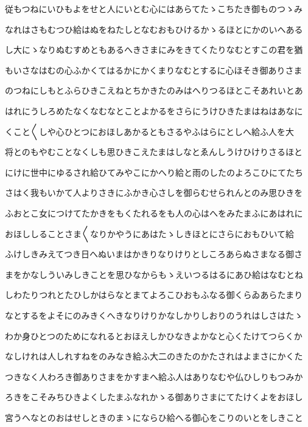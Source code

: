 \documentclass[a4paper,11pt,landscape]{ltjtarticle}
\begin{document}
\par\medskip
従もつねにいひもよをせと人にいとむ心にはあらてたゝこちたき御ものつゝみ
\par\medskip
なれはさもむつひ給はぬをねたしとなむおもひけるかゝるほとにかのいへある
\par\medskip
し大にゝなりぬむすめともあるへきさまにみをきてくたりなむとすこの君を猶
\par\medskip
もいさなはむの心ふかくてはるかにかくまりなむとするに心ほそき御ありさま
\par\medskip
のつねにしもとふらひきこえねとちかきたのみはへりつるほとこそあれいとあ
\par\medskip
はれにうしろめたなくなむなとことよかるをさらにうけひきたまはねはあなに
\par\medskip
くこと〱しや心ひとつにおほしあかるともさるやふはらにとしへ給ふ人を大
\par\medskip
将とのもやむことなくしも思ひきこえたまはしなとゑんしうけひけりさるほと
\par\medskip
にけに世中にゆるされ給ひてみやこにかへり給と雨のしたのよろこひにてたち
\par\medskip
さはく我もいかて人よりさきにふかき心さしを御らむせられんとのみ思ひきを
\par\medskip
ふおとこ女につけてたかきをもくたれるをも人の心はへをみたまふにあはれに
\par\medskip
おほししることさま〱なりかやうにあはたゝしきほとにさらにおもひいて給
\par\medskip
ふけしきみえてつき日へぬいまはかきりなりけりとしころあらぬさまなる御さ
\par\medskip
まをかなしういみしきことを思ひなからもゝえいつるはるにあひ給はなむとね
\par\medskip
しわたりつれとたひしかはらなとまてよろこひおもふなる御くらゐあらたまり
\par\medskip
なとするをよそにのみきくへきなりけりかなしかりしおりのうれはしさはたゝ
\par\medskip
わか身ひとつのためになれるとおほえしかひなきよかなと心くたけてつらくか
\par\medskip
なしけれは人しれすねをのみなき給ふ大二のきたのかたされはよまさにかくた
\par\medskip
つきなく人わろき御ありさまをかすまへ給ふ人はありなむや仏ひしりもつみか
\par\medskip
ろきをこそみちひきよくしたまふなれかゝる御ありさまにてたけくよをおほし
\par\medskip
宮うへなとのおはせしときのまゝにならひ給へる御心をこりのいとをしきこと
\end{document}

